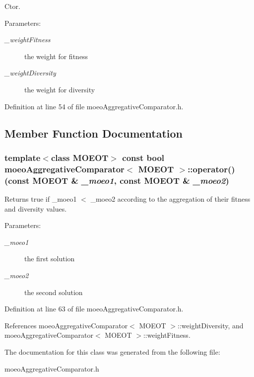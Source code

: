 Ctor. 

\begin{Desc}
\item[Parameters:]
\begin{description}
\item[{\em \_\-weight\-Fitness}]the weight for fitness \item[{\em \_\-weight\-Diversity}]the weight for diversity \end{description}
\end{Desc}


Definition at line 54 of file moeo\-Aggregative\-Comparator.h.

\subsection{Member Function Documentation}
\subsubsection{\setlength{\rightskip}{0pt plus 5cm}template$<$class MOEOT$>$ const bool \bf{moeo\-Aggregative\-Comparator}$<$ MOEOT $>$::operator() (const MOEOT \& {\em \_\-moeo1}, const MOEOT \& {\em \_\-moeo2})\hspace{0.3cm}{\tt  [inline]}}\label{classmoeoAggregativeComparator_2f6745ebc2d575e64b162fc250f04b0f}


Returns true if \_\-moeo1 $<$ \_\-moeo2 according to the aggregation of their fitness and diversity values. 

\begin{Desc}
\item[Parameters:]
\begin{description}
\item[{\em \_\-moeo1}]the first solution \item[{\em \_\-moeo2}]the second solution \end{description}
\end{Desc}


Definition at line 63 of file moeo\-Aggregative\-Comparator.h.

References moeo\-Aggregative\-Comparator$<$ MOEOT $>$::weight\-Diversity, and moeo\-Aggregative\-Comparator$<$ MOEOT $>$::weight\-Fitness.

The documentation for this class was generated from the following file:\begin{CompactItemize}
\item 
moeo\-Aggregative\-Comparator.h\end{CompactItemize}
